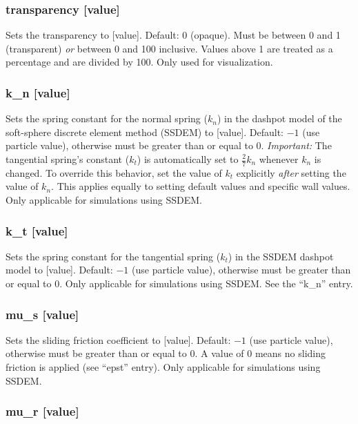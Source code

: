 \subsubsection{transparency [value]}

Sets the transparency to [value].  Default: 0 (opaque).  Must be
between 0 and 1 (transparent) \emph{or} between 0 and 100 inclusive.
Values above 1 are treated as a percentage and are divided by 100.
Only used for visualization.

\subsubsection{k\_n [value]}

Sets the spring constant for the normal spring ($k_n$) in the dashpot
model of the soft-sphere discrete element method (SSDEM) to [value].
Default: $-1$ (use particle value), otherwise must be greater than or
equal to 0.  \emph{Important:} The tangential spring's constant
($k_t$) is automatically set to $\frac{2}{7}k_n$ whenever $k_n$ is
changed.  To override this behavior, set the value of $k_t$ explicitly
\emph{after} setting the value of $k_n$.  This applies equally to
setting default values and specific wall values.  Only applicable for
simulations using SSDEM.

\subsubsection{k\_t [value]}

Sets the spring constant for the tangential spring ($k_t$) in the
SSDEM dashpot model to [value].  Default: $-1$ (use particle value),
otherwise must be greater than or equal to 0.  Only applicable for
simulations using SSDEM.  See the ``k\_n'' entry.

\subsubsection{mu\_s [value]}

Sets the sliding friction coefficient to [value].  Default: $-1$ (use
particle value), otherwise must be greater than or equal to 0.  A
value of 0 means no sliding friction is applied (see ``epst'' entry).
Only applicable for simulations using SSDEM.

\subsubsection{mu\_r [value]}

